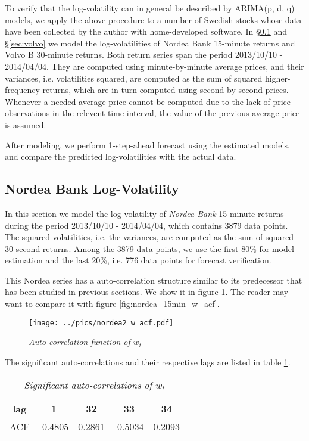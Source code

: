 To verify that the log-volatility can in general be described by
ARIMA(p, d, q) models, we apply the above procedure to a number of
Swedish stocks whose data have been collected by the author with
home-developed software. In \S\ref{sec:nordea} and \S\ref{sec:volvo}
we model the log-volatilities of Nordea Bank 15-minute returns and
Volvo B 30-minute returns. Both return series span the period
2013/10/10 - 2014/04/04. They are computed using minute-by-minute
average prices, and their variances, i.e. volatilities squared, are
computed as the sum of squared higher-frequency returns, which are in
turn computed using second-by-second prices. Whenever a needed average
price cannot be computed due to the lack of price observations in the
relevent time interval, the value of the previous average price is
assumed.

After modeling, we perform 1-step-ahead forecast using the estimated
models, and compare the predicted log-volatilities with the actual
data.

\subsection{Nordea Bank Log-Volatility}\label{sec:nordea}
In this section we model the log-volatility of {\it Nordea Bank}
15-minute returns during the period 2013/10/10 - 2014/04/04, which
contains 3879 data points. The squared volatilities, i.e. the
variances, are computed as the sum of squared 30-second returns. Among
the 3879 data points, we use the first 80\% for model estimation and
the last 20\%, i.e. 776 data points for forecast verification.

This Nordea series has a auto-correlation structure similar to its
predecessor that has been studied in previous sections. We show it in
figure \ref{fig:nordea2_w_acf}. The reader may want to compare it with
figure \ref{fig:nordea_15min_w_acf}.
\begin{figure}[htb!]
  \centering
  \texttt{[image: ../pics/nordea2\_w\_acf.pdf]}
  \caption{\small \it Auto-correlation function of $w_t$}
  \label{fig:nordea2_w_acf}
\end{figure}
The significant auto-correlations and their respective lags are listed
in table \ref{tab:nordea2_w_acf}.
\begin{table}[htb!]
  \centering
  \begin{tabular}{|c|c|c|c|c|}
    \hline
    lag & 1 & 32 & 33 & 34 \\
    \hline
    ACF &   -0.4805 & 0.2861 &  -0.5034 & 0.2093 \\
    \hline
  \end{tabular}
  \caption{\small \it Significant auto-correlations of $w_t$}
  \label{tab:nordea2_w_acf}
\end{table}

